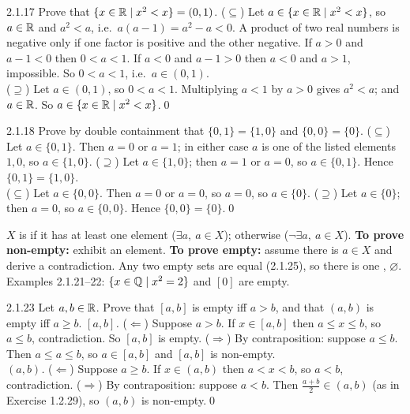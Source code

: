 \begin{bookex}[recommended]{2.1.17}
Prove that $\{x\in\mathbb{R}\mid x^2<x\}=(0,1)$.
\solution
($\subseteq$) Let $a\in\{x\in\mathbb{R}\mid x^2<x\}$, so $a\in\mathbb{R}$ and $a^2<a$, i.e.\ $a(a-1)=a^2-a<0$. A product of two real numbers is negative only if one factor is positive and the other negative. If $a>0$ and $a-1<0$ then $0<a<1$. If $a<0$ and $a-1>0$ then $a<0$ and $a>1$, impossible. So $0<a<1$, i.e.\ $a\in(0,1)$.\\
($\supseteq$) Let $a\in(0,1)$, so $0<a<1$. Multiplying $a<1$ by $a>0$ gives $a^2<a$; and $a\in\mathbb{R}$. So $a\in\{x\in\mathbb{R}\mid x^2<x\}$.\qed
\end{bookex}

\begin{bookex}[recommended]{2.1.18}
Prove by double containment that $\{0,1\}=\{1,0\}$ and $\{0,0\}=\{0\}$.
\solution
($\subseteq$) Let $a\in\{0,1\}$. Then $a=0$ or $a=1$; in either case $a$ is one of the listed elements $1,0$, so $a\in\{1,0\}$. ($\supseteq$) Let $a\in\{1,0\}$; then $a=1$ or $a=0$, so $a\in\{0,1\}$. Hence $\{0,1\}=\{1,0\}$.\\
($\subseteq$) Let $a\in\{0,0\}$. Then $a=0$ or $a=0$, so $a=0$, so $a\in\{0\}$. ($\supseteq$) Let $a\in\{0\}$; then $a=0$, so $a\in\{0,0\}$. Hence $\{0,0\}=\{0\}$.\qed
\end{bookex}

\begin{key}
$X$ is  if it has at least one element ($\exists a,\ a\in X$); otherwise  ($\neg\exists a,\ a\in X$). \textbf{To prove non-empty:} exhibit an element. \textbf{To prove empty:} assume there is $a\in X$ and derive a contradiction. Any two empty sets are equal (2.1.25), so there is one , $\varnothing$. Examples 2.1.21--22: $\{x\in\mathbb{Q}\mid x^2=2\}$ and $[0]$ are empty.
\end{key}

\begin{bookex}[recommended]{2.1.23}
Let $a,b\in\mathbb{R}$. Prove that $[a,b]$ is empty iff $a>b$, and that $(a,b)$ is empty iff $a\ge b$.
\solution
\emph{$[a,b]$.} ($\Leftarrow$) Suppose $a>b$. If $x\in[a,b]$ then $a\le x\le b$, so $a\le b$, contradiction. So $[a,b]$ is empty. ($\Rightarrow$) By contraposition: suppose $a\le b$. Then $a\le a\le b$, so $a\in[a,b]$ and $[a,b]$ is non-empty.\\
\emph{$(a,b)$.} ($\Leftarrow$) Suppose $a\ge b$. If $x\in(a,b)$ then $a<x<b$, so $a<b$, contradiction. ($\Rightarrow$) By contraposition: suppose $a<b$. Then $\frac{a+b}2\in(a,b)$ (as in Exercise 1.2.29), so $(a,b)$ is non-empty.\qed
\end{bookex}

